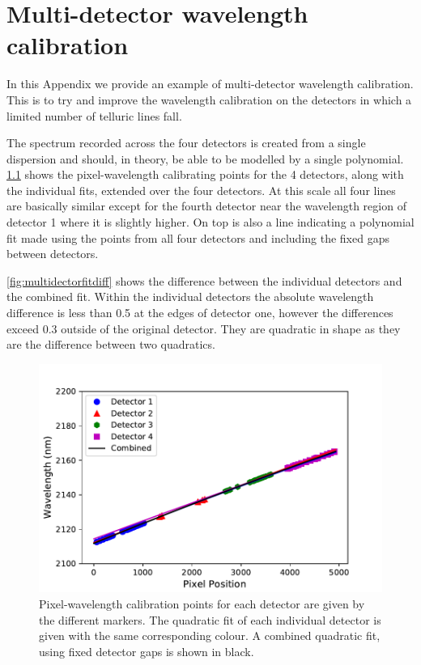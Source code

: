 
\chapter{Multi-detector wavelength calibration} %
\label{appendix:wavelength_fitting}

In this Appendix we provide an example of multi-detector wavelength calibration.
This is to try and improve the wavelength calibration on the detectors in which a limited number of telluric lines fall.

The spectrum recorded across the four detectors is created from a single dispersion and should, in theory, be able to be modelled by a single polynomial.
\cref{fig:multidectorfit} shows the pixel-wavelength calibrating points for the 4 detectors, along with the individual fits, extended over the four detectors.
At this scale all four lines are basically similar except for the fourth detector near the wavelength region of detector 1 where it is slightly higher.
On top is also a line indicating a polynomial fit made using the points from all four detectors and including the fixed gaps between detectors.

\cref{fig:multidectorfitdiff} shows the difference between the individual detectors and the combined fit.
Within the individual detectors the absolute wavelength difference is less than 0.5\nm{} at the edges of detector one, however the differences exceed 0.3\nm{} outside of the original detector.
They are quadratic in shape as they are the difference between two quadratics.

\begin{figure}
    \centering
    \includegraphics[width=0.7\linewidth]{./figures/appendix/combined_wav_fit}
    \caption[Multi-detector fit and difference to individual fits.]{Pixel-wavelength calibration points for each detector are given by the different markers.
    The quadratic fit of each individual detector is given with the same corresponding colour.
    A combined quadratic fit, using fixed detector gaps is shown in black.}
    \label{fig:multidectorfit}
\end{figure}

